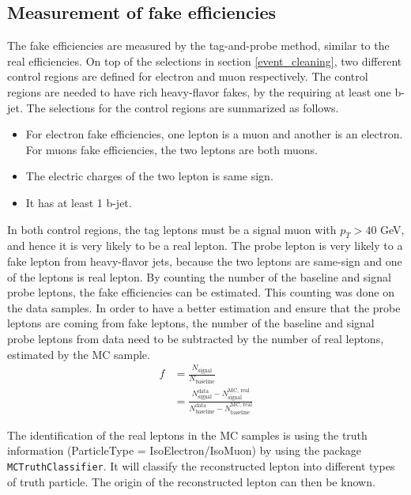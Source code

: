 \subsection{Measurement of fake efficiencies}
The fake efficiencies are measured by the tag-and-probe method, similar to the real efficiencies.
On top of the selections in section \ref{event_cleaning}, two different control regions are defined for electron and muon respectively.
The control regions are needed to have rich heavy-flavor fakes, by the requiring at least one b-jet.
The selections for the control regions are summarized as follows.
\begin{itemize}
\item For electron fake efficiencies, one lepton is a muon and another is an electron. For muons fake efficiencies, the two leptons are both muons.
\item The electric charges of the two lepton is same sign.
\item It has at least 1 b-jet.
\end{itemize}

In both control regions, the tag leptons must be a signal muon with $p_T > 40$ GeV, and hence it is very likely to be a real lepton.
The probe lepton is very likely to a fake lepton from heavy-flavor jets, because the two leptons are same-sign and one of the leptons is real lepton.
By counting the number of the baseline and signal probe leptons, the fake efficiencies can be estimated.
This counting was done on the data samples.
In order to have a better estimation and ensure that the probe leptons are coming from fake leptons, the number of the baseline and signal probe leptons from data need to be subtracted by the number of real leptons, estimated by the MC sample.
\begin{align}
f &= \frac{N_{\text{signal}}}{N_{\text{baseline}}} \\
&= \frac{N^{\text{data}}_{\text{signal}} - N^{\text{MC, real}}_{\text{signal}}}{N^{\text{data}}_{\text{baseline}} - N^{\text{MC, real}}_{\text{baseline}}}
\end{align}

The identification of the real leptons in the MC samples is using the truth information (ParticleType = IsoElectron/IsoMuon) by using the package \texttt{MCTruthClassifier}.
It will classify the reconstructed lepton into different types of truth particle.
The origin of the reconstructed lepton can then be known.

